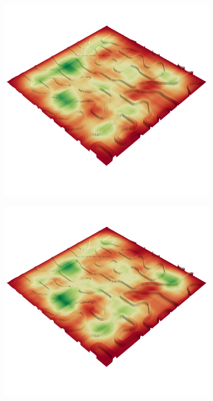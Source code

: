 \documentclass[../document.tex]{subfiles}
\begin{document}
\begin{figure}[H]
  \centering
  \begin{subfigure}[b]{0.45\textwidth}
    \includegraphics[width=\linewidth]{../img/4/traversability/bars/-270.png} 
  \end{subfigure}
  \begin{subfigure}[b]{0.45\textwidth}
      \includegraphics[width=\linewidth]{../img/4/traversability/bars/-90.png}

\end{subfigure}
\end{figure}
\end{document}
